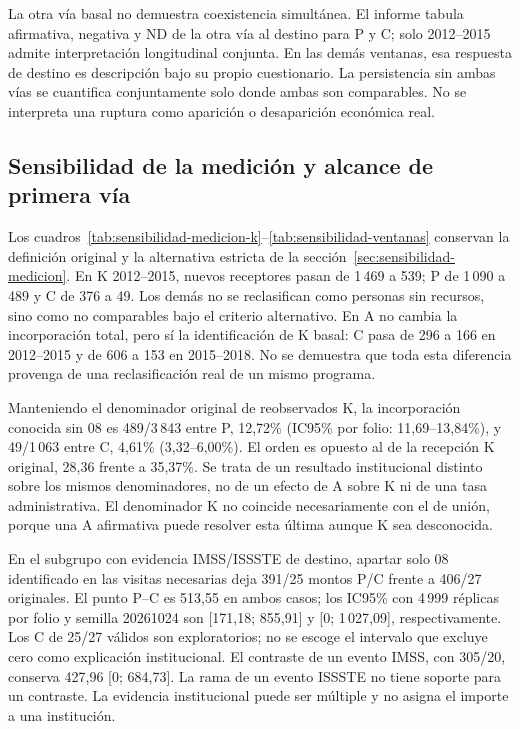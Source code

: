 La otra vía basal no demuestra coexistencia simultánea. El informe tabula afirmativa, negativa y ND de la otra vía al destino para P y C; solo 2012--2015 admite interpretación longitudinal conjunta. En las demás ventanas, esa respuesta de destino es descripción bajo su propio cuestionario. La persistencia sin ambas vías se cuantifica conjuntamente solo donde ambas son comparables. No se interpreta una ruptura como aparición o desaparición económica real.

\subsection{Sensibilidad de la medición y alcance de primera vía}
\label{sec:resultados-sensibilidad-medicion}

Los cuadros~\ref{tab:sensibilidad-medicion-k}--\ref{tab:sensibilidad-ventanas}
conservan la definición original y la alternativa estricta de la
sección~\ref{sec:sensibilidad-medicion}. En K 2012--2015, nuevos receptores
pasan de 1\,469 a 539; P de 1\,090 a 489 y C de 376 a 49. Los demás no se
reclasifican como personas sin recursos, sino como no comparables bajo el
criterio alternativo. En A no cambia la incorporación total, pero sí la
identificación de K basal: C pasa de 296 a 166 en 2012--2015 y de 606 a 153
en 2015--2018. No se demuestra que toda esta diferencia provenga de una
reclasificación real de un mismo programa.

Manteniendo el denominador original de reobservados K, la incorporación
conocida sin 08 es 489/3\,843 entre P, 12{,}72\% (IC95\% por folio:
11{,}69--13{,}84\%), y 49/1\,063 entre C, 4{,}61\% (3{,}32--6{,}00\%).
El orden es opuesto al de la recepción K original, 28{,}36 frente a
35{,}37\%. Se trata de un resultado institucional distinto sobre los mismos
denominadores, no de un efecto de A sobre K ni de una tasa administrativa.
El denominador K no coincide necesariamente con el de unión, porque una
A afirmativa puede resolver esta última aunque K sea desconocida.

En el subgrupo con evidencia IMSS/ISSSTE de destino, apartar solo 08
identificado en las visitas necesarias deja 391/25 montos P/C frente a
406/27 originales. El punto P--C es 513{,}55 en ambos casos; los IC95\%
con 4\,999 réplicas por folio y semilla 20261024 son [171{,}18; 855{,}91]
y [0; 1\,027{,}09], respectivamente. Los C de 25/27 válidos son exploratorios;
no se escoge el intervalo que excluye cero como explicación institucional.
El contraste de un evento IMSS, con 305/20, conserva 427{,}96 [0; 684{,}73].
La rama de un evento ISSSTE no tiene soporte para un contraste. La evidencia
institucional puede ser múltiple y no asigna el importe a una institución.

